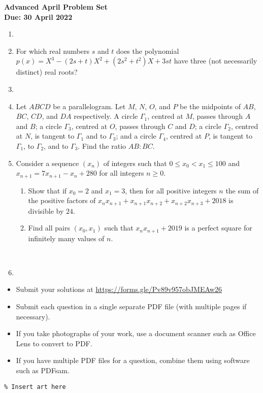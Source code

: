 \documentclass{article}
\begin{document}
\thispagestyle{empty}

\begin{center}
  \textbf{\Large Advanced April Problem Set}
  \\ \vspace{1em}
  \textbf{\large Due: 30 April 2022}
\end{center}

\bigskip

\begin{enumerate}[itemsep=\fill]

\item %


\item %
For which real numbers $s$ and $t$ does the polynomial $p(x) = X^3 -(2s+t)X^2 +(2s^2+t^2)X +3st$ have three (not necessarily distinct) real roots?


\item %


\item %
Let $ABCD$ be a parallelogram.
Let $M$, $N$, $O$, and $P$ be the midpoints of $AB$, $BC$, $CD$, and $DA$ respectively.
A circle $\Gamma_1$, centred at $M$, passes through $A$ and $B$; a circle $\Gamma_3$, centred at $O$, passes through $C$ and $D$; a circle $\Gamma_2$, centred at $N$, is tangent to $\Gamma_1$ and to $\Gamma_3$; and a circle $\Gamma_4$, centred at $P$, is tangent to $\Gamma_1$, to $\Gamma_2$, and to $\Gamma_3$.
Find the ratio $AB:BC$.


\item %
Consider a sequence $(x_n)$ of integers such that $0 \leq x_0 < x_1 \leq 100$ and $x_{n+1} = 7x_{n+1} -x_n +280$ for all integers $n \geq 0$.
\begin{enumerate}
	\item Show that if $x_0 = 2$ and $x_1 = 3$, then for all positive integers $n$ the sum of the positive factors of $x_n x_{n+1} +x_{n+1}x_{n+2} +x_{n+2}x_{n+3} +2018$ is divisible by $24$.
	\item Find all pairs $(x_0,x_1)$ such that $x_n x_{n+1} +2019$ is a perfect square for infinitely many values of $n$.
\end{enumerate}~


\item %

\end{enumerate}


\vfill
\small
\begin{itemize}
	\item Submit your solutions at \href{https://forms.gle/Pv89v957obJMEAw26}{https://forms.gle/Pv89v957obJMEAw26}
	\item Submit each question in a single separate PDF file (with multiple pages if necessary).
	\item If you take photographs of your work, use a document scanner such as Office Lens to convert to PDF.
	\item If you have multiple PDF files for a question, combine them using software such as PDFsam.
\end{itemize}

\vfill
\centering
\small
\begin{BVerbatim}
\end{BVerbatim}
\end{document}
